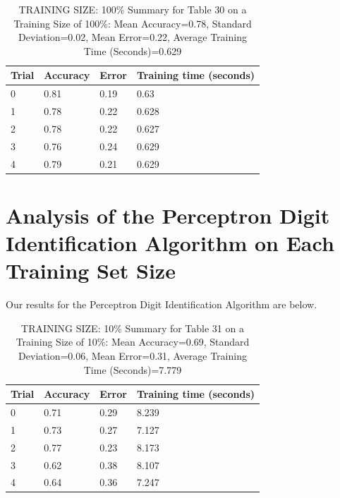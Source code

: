 \documentclass{article}
\begin{document}
\begin{table}[H]

\centering
{\begin{tabular}{||p{1cm}|p{1.8cm}|p{1.8cm}|p{3cm}||}
 \hline
Trial & Accuracy & Error & Training time (seconds) \\ [0.5ex] 
 \hline\hline
   0 & 0.81 & 0.19 & 0.63\\
\hline
   1 & 0.78 & 0.22 & 0.628\\
\hline
   2 & 0.78 & 0.22 & 0.627\\
\hline
   3 & 0.76 & 0.24 & 0.629\\
\hline
   4 & 0.79 & 0.21 & 0.629\\
\hline
\end{tabular}}
\caption{TRAINING SIZE: 100\% \newline Summary for Table 30 on a Training Size of 100\%: Mean Accuracy=0.78, Standard Deviation=0.02, Mean Error=0.22, Average Training Time (Seconds)=0.629}
\end{table} 


\section{Analysis of the Perceptron Digit Identification Algorithm on Each Training Set Size}

Our results for the Perceptron Digit Identification Algorithm are below.

\begin{table}[H]

\centering
{\begin{tabular}{||p{1cm}|p{1.8cm}|p{1.8cm}|p{3cm}||}
 \hline
Trial & Accuracy & Error & Training time (seconds) \\ [0.5ex] 
 \hline\hline
   0  & 0.71  & 0.29  & 8.239\\
\hline
   1  & 0.73  & 0.27  & 7.127\\
\hline
   2  & 0.77  & 0.23  & 8.173\\
\hline
   3  & 0.62  & 0.38  & 8.107\\
\hline
   4  & 0.64  & 0.36  & 7.247\\
\hline
\end{tabular}}
\caption{TRAINING SIZE: 10\% \newline Summary for Table 31 on a Training Size of 10\%: Mean Accuracy=0.69, Standard Deviation=0.06, Mean Error=0.31, Average Training Time (Seconds)=7.779}
\end{table} 
\end{document}
